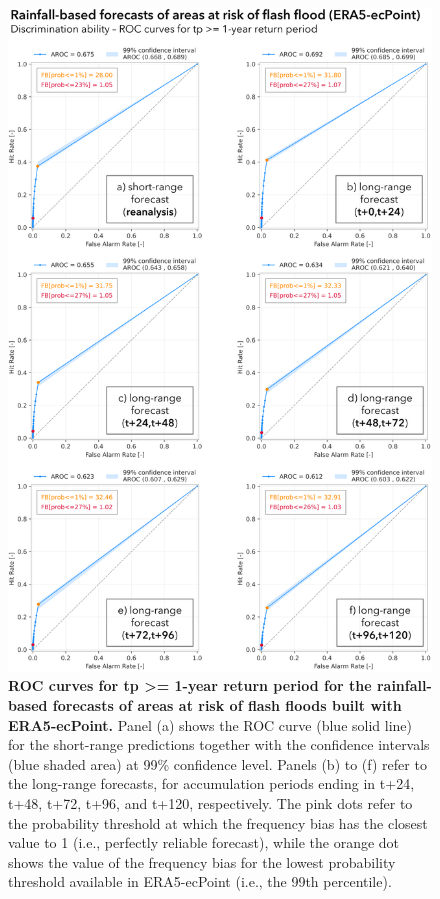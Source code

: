 \begin{figure}[htbp]
\centering
\includegraphics[width=\textwidth]{chapter_05/figures/rainfall_based_ff_roc_1rp.png}
\caption{\textbf{ROC curves for tp >= 1-year return period for the rainfall-based forecasts of areas at risk of flash floods built with ERA5-ecPoint.} Panel (a) shows the ROC curve (blue solid line) for the short-range predictions together with the confidence intervals (blue shaded area) at 99\% confidence level. Panels (b) to (f) refer to the long-range forecasts, for accumulation periods ending in t+24, t+48, t+72, t+96, and t+120, respectively. The pink dots refer to the probability threshold at which the frequency bias has the closest value to 1 (i.e., perfectly reliable forecast), while the orange dot shows the value of the frequency bias for the lowest probability threshold available in ERA5-ecPoint (i.e., the 99th percentile).}
\label{fig:rainfall_based_ff_roc_1rp}
\end{figure}




